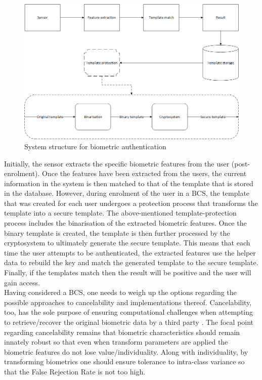 
\begin{figure}[htbp!] 
\centering    
\includegraphics[width=1.0\textwidth]{Chapter2/Figs/Figure2-1.png}
\caption[System structure for biometric authentication]{System structure for biometric authentication}
\label{fig:System structure for biometric authentication}
\end{figure}

Initially, the sensor extracts the specific biometric features from the user (post-enrolment). Once the features have been extracted from the users, the current information in the system is then matched to that of the template that is stored in the database. However, during enrolment of the user in a BCS, the template that was created for each user undergoes a protection process that transforms the template into a secure template. The above-mentioned template-protection process includes the binarisation of the extracted biometric features. Once the binary template is created, the template is then further processed by the cryptosystem to ultimately generate the secure template. This means that each time the user attempts to be authenticated, the extracted features use the helper data to rebuild the key and match the generated template to the secure template. Finally, if the templates match then the result will be positive and the user will gain access.\\

Having considered a BCS, one needs to weigh up the options regarding the possible approaches to cancelability and implementations thereof. Cancelability, too, has the sole purpose of ensuring computational challenges when attempting to retrieve/recover the original biometric data by a third party \citep{Rathgeb2011}. The focal point regarding cancelability remains that biometric characteristics should remain innately robust so that even when transform parameters are applied the biometric features do not lose value/individuality. Along with individuality, by transforming biometrics one should ensure tolerance to intra-class variance so that the False Rejection Rate is not too high. \\

